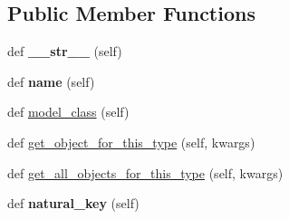 \subsection*{Public Member Functions}
\begin{DoxyCompactItemize}
\item 
\mbox{\label{classdjango_1_1contrib_1_1contenttypes_1_1models_1_1_content_type_ab44a27b45c576241cb45bba09f575393}} 
def {\bfseries \+\_\+\+\_\+str\+\_\+\+\_\+} (self)
\item 
\mbox{\label{classdjango_1_1contrib_1_1contenttypes_1_1models_1_1_content_type_a1577e45d8940ca8ce7032df05c0920f1}} 
def {\bfseries name} (self)
\item 
def \mbox{\hyperlink{classdjango_1_1contrib_1_1contenttypes_1_1models_1_1_content_type_a767f29de658300c34aaeb818ed6a47cd}{model\+\_\+class}} (self)
\item 
def \mbox{\hyperlink{classdjango_1_1contrib_1_1contenttypes_1_1models_1_1_content_type_a87d92aab8b23e24c21e82b7fe8edb42e}{get\+\_\+object\+\_\+for\+\_\+this\+\_\+type}} (self, kwargs)
\item 
def \mbox{\hyperlink{classdjango_1_1contrib_1_1contenttypes_1_1models_1_1_content_type_abc34d7a20157f2bdbfda9ca53da0e925}{get\+\_\+all\+\_\+objects\+\_\+for\+\_\+this\+\_\+type}} (self, kwargs)
\item 
\mbox{\label{classdjango_1_1contrib_1_1contenttypes_1_1models_1_1_content_type_a8497ad86092b9cf8a81c0b1bb2c4571d}} 
def {\bfseries natural\+\_\+key} (self)
\end{DoxyCompactItemize}
